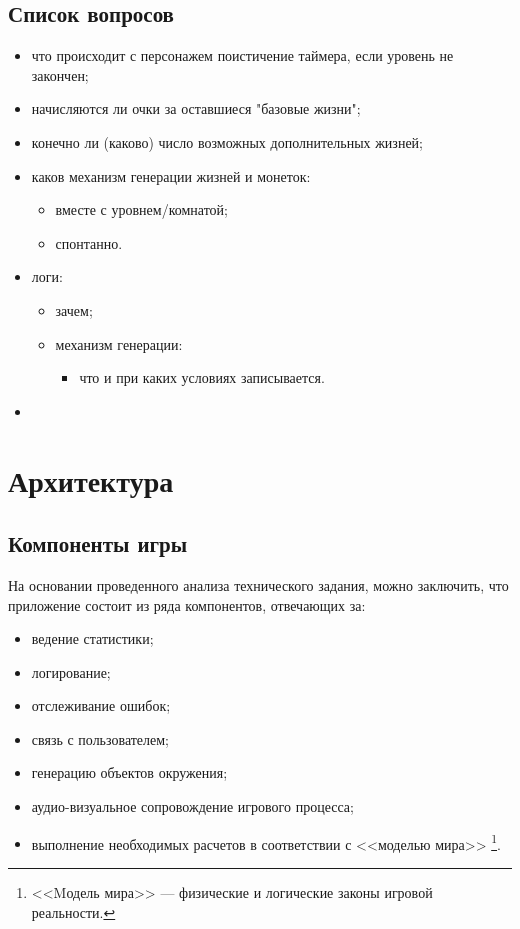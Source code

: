 \documentclass[12pt,a4paper,fullpage,titlepage]{article}
\begin{document}
\subsection{Список вопросов}
\begin{itemize}
	\item что происходит с персонажем поистичение таймера, если уровень не закончен;
	\item начисляются ли очки за оставшиеся "базовые жизни";
	\item конечно ли (каково) число возможных дополнительных жизней;
	\item каков механизм генерации жизней и монеток:
	\begin{itemize}
		\item вместе с уровнем/комнатой;
		\item спонтанно.
	\end{itemize}
	\item логи:
	\begin{itemize}
		\item зачем;
		\item механизм генерации:
		\begin{itemize}
			\item что и при каких условиях записывается.
		\end{itemize}
	\end{itemize}
	\item 
\end{itemize}


\newpage
\section{Архитектура}

\subsection{Компоненты игры}
На основании проведенного анализа технического задания, можно заключить, что приложение состоит из ряда компонентов, отвечающих за:
\begin{itemize}	
	\item ведение статистики;	
	\item логирование;	
	\item отслеживание ошибок;	
	\item связь с пользователем;	
	\item генерацию объектов окружения;	
	\item аудио-визуальное сопровождение игрового процесса;
	\item выполнение необходимых расчетов в соответствии с <<моделью мира>> \footnote{<<Mодель мира>> --- физические и логические законы игровой реальности.}.\\
\end{itemize}
\end{document}
